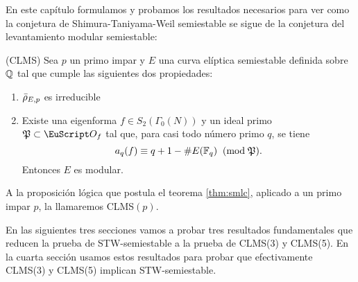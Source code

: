 \documentclass[../../tesis_maestria]{subfiles}
\begin{document}

En este cap\'itulo formulamos y probamos los resultados necesarios para ver como la conjetura
de Shimura-Taniyama-Weil semiestable se sigue de la conjetura del levantamiento modular
semiestable:

\begin{thm}\label{thm:smlc}(CLMS)
  Sea $p$ un primo impar y $E$ una curva el\'iptica semiestable definida sobre $\mathbb{Q}$ tal que
  cumple las siguientes dos propiedades:
  \begin{enumerate}[label=\emph{\roman*})]
  \item $\bar{\rho}_{E,p}$ es irreducible
  \item\label{cond_ii} Existe una eigenforma $f\in S_2(\Gamma_0(N))$ y un ideal primo
    $\fP\subset\Oo_f$ tal que, para casi todo n\'umero primo $q$, se tiene
    \[
      a_q(f) \equiv q+1-\# E(\mathbb{F}_q) \;\;(\mathrm{mod}\; \mathfrak{P}).
    \]
    Entonces $E$ es modular.
  \end{enumerate}
\end{thm}

A la proposici\'on l\'ogica que postula el teorema \ref{thm:smlc}, aplicado a un primo impar $p$,
la llamaremos CLMS$(p)$.

En las siguientes tres secciones vamos a probar tres resultados fundamentales que reducen la
prueba de STW-semiestable a la prueba de CLMS(3) y CLMS(5). En la cuarta secci\'on usamos estos
resultados para probar que efectivamente CLMS(3) y CLMS(5) implican STW-semiestable.
\end{document}
